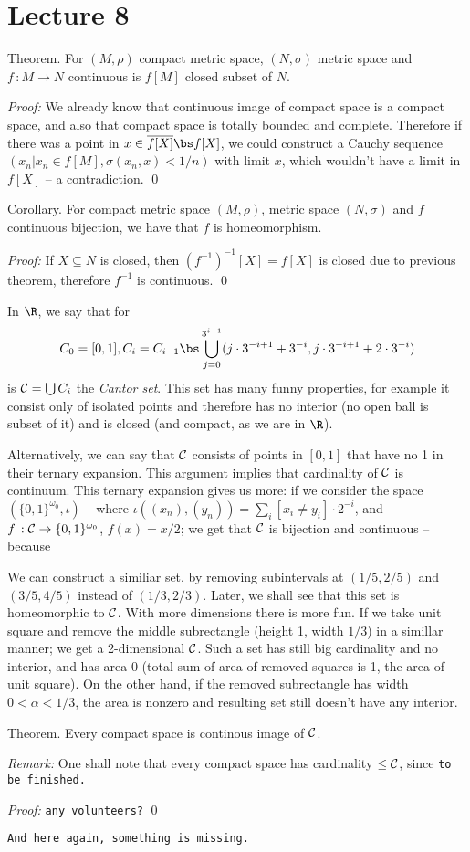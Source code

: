 \chapter{Lecture 8}

\proclaim Theorem. For $(M,\rho)$ compact metric space, $(N,\sigma)$ metric
space and $f\,:M \to N$ continuous is $f[M]$ closed subset of $N$.

{\it Proof:} We already know that continuous image of compact space is a compact
space, and also that compact space is totally bounded and complete. Therefore
if there was a point in $x\in \overline{f[X]} \bs f[X]$, we could construct a 
Cauchy sequence $(x_n|x_n \in f[M], \sigma(x_n,x)<1/n)$ with limit $x$, which 
wouldn't have a limit in $f[X]$ -- a contradiction.
\qed

\proclaim Corollary. For compact metric space $(M,\rho)$, metric space 
$(N,\sigma)$ and $f$ continuous bijection, we have that $f$ is homeomorphism.

{\it Proof:} If $X\subseteq N$ is closed, then $(f^{-1})^{-1}[X] = f[X]$ is
closed due to previous theorem, therefore $f^{-1}$ is continuous.
\qed

 In $\R$, we say that for $$C_0 = [0,1], C_i = C_{i-1} \bs 
\bigcup_{j=0}^{3^{i-1}} (j\cdot 3^{-i+1} + 3^{-i}, j\cdot 3^{-i+1} + 2\cdot 
3^{-i})$$
is ${\cal C}=\bigcup C_i$ the {\it Cantor set}. This set has many funny 
properties, for example it consist only of isolated points and therefore has 
no interior (no open ball is subset of it) and is closed (and compact, as we 
are in $\R$).

Alternatively, we can say that $\cal C$ consists of points in $[0,1]$ that have 
no 1 in their ternary expansion. This argument implies that cardinality of
$\cal C$ is continuum. This ternary expansion gives us more: if we consider 
the space $(\{0,1\}^{\omega_0},\iota)$ -- where $\iota((x_n),(y_n)) = \sum_i 
[x_i \neq y_i]\cdot 2^{-i}$, and $f\,:{\cal C} \to \{0,1\}^{\omega_0}$, 
$f(x) = x/2$; we get that $\cal C$ is bijection and continuous -- because

We can construct a similiar set, by removing subintervals at $(1/5,2/5)$ and
$(3/5,4/5)$ instead of $(1/3,2/3)$. Later, we shall see that this set is 
homeomorphic to $\cal C$. With more dimensions there is more fun. If we take 
unit square and remove the middle subrectangle (height 1, width $1/3$) in 
a simillar manner; we get a 2-dimensional $\cal C$. Such a set has still big
cardinality and no interior, and has area 0 (total sum of area of removed
squares is 1, the area of unit square). On the other hand, if the removed
subrectangle has width $0 < \alpha < 1/3$, the area is nonzero and resulting
set still doesn't have any interior.

\proclaim Theorem. Every compact space is continous image of $\cal C$.

{\it Remark:} One shall note that every compact space has cardinality $\leq 
\cal C$, since {\tt to be finished.}

{\it Proof:} {\tt any volunteers?}
\qed

{\tt And here again, something is missing.}
